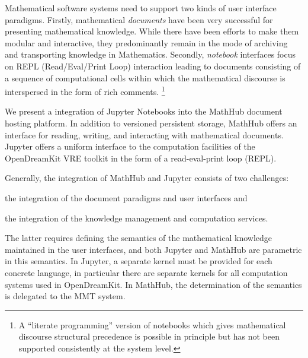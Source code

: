 
Mathematical software systems need to support two kinds of user interface paradigms.
Firstly, mathematical \emph{documents} have been very successful for presenting mathematical knowledge.
While there have been efforts to make them modular and interactive, they predominantly remain in the mode of archiving and transporting knowledge in Mathematics.
Secondly, \emph{notebook} interfaces focus on REPL (Read/Eval/Print Loop) interaction leading to documents consisting of a sequence of computational cells within which the mathematical discourse is interspersed in the form of rich comments.
\footnote {A ``literate programming'' version of notebooks which gives mathematical discourse structural precedence is possible in principle but has not been supported consistently at the system level.}

We present a integration of Jupyter Notebooks into the MathHub document hosting platform.
In addition to versioned persistent storage, MathHub offers an interface for reading, writing, and interacting with mathematical documents.
Jupyter offers a uniform interface to the computation facilities of the OpenDreamKit VRE toolkit in the form of a read-eval-print loop (REPL).

Generally, the integration of MathHub and Jupyter consists of two challenges:
\begin{inparaenum}[\em a\rm )]
\item the integration of the document paradigms and user interfaces and
\item the integration of the knowledge management and computation services.
\end{inparaenum}
The latter requires defining the semantics of the mathematical knowledge maintained in the user interfaces, and both Jupyter and MathHub are parametric in this semantics.
In Jupyter, a separate kernel must be provided for each concrete language, in particular there are separate kernels for all computation systems used in OpenDreamKit.
In MathHub, the determination of the semantics is delegated to the MMT system.

